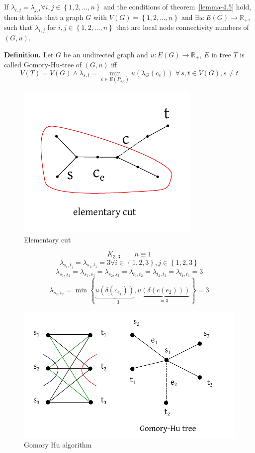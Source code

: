 \documentclass{article}
\newcommand{\set}[1]{\left\{#1\right\}}
\newcommand{\fall}{\;\forall\,}
\begin{document}
  If $\lambda_{i,j} = \lambda_{j,i} \forall i,j \in \set{1, 2, \ldots, n}$ and the conditions of theorem~\ref{lemma-4.5} hold, then it holds that a graph $G$ with $V(G) = \set{1, 2, \ldots, n}$ and $\exists u: E(G) \rightarrow \mathbb{R}_+$, such that $\lambda_{i,j}$ for $i,j \in \set{1, 2, \ldots, n}$ that are local node connectivity numbers of $(G, u)$.

\textbf{Definition.}
  Let $G$ be an undirected graph and $u: E(G) \rightarrow \mathbb{R}_+$, $E$ in tree $T$ is called Gomory-Hu-tree of $(G, u)$ iff
  \[
    V(T) = V(G) \land \lambda_{s,t} = \min_{e \in E(P_{s,t})} u(\lambda_G (c_e)) \fall s,t \in V(G), s \neq t
  \]

\begin{figure}[ht]
 \begin{center}
  \includegraphics{img/fundamental_cut.pdf}
  \caption{Elementary cut}
 \end{center}
\end{figure}

\[
  K_{3,3} \qquad n \equiv 1
\] \[
  \lambda_{s_i,t_j} = \lambda_{s_1, t_1} = 3 \forall i \in \set{1, 2, 3}, j \in \set{1, 2, 3}
\] \[
  \lambda_{s_1,s_2} = \lambda_{s_1,s_3} = \lambda_{s_2,s_3} = \lambda_{t_1,t_2}
    = \lambda_{t_2,t_3} = \lambda_{t_1,t_3} = 3
\] \[
  \lambda_{s_2, t_2} = \min\set{
    \underbrace{u(\delta(c_{e_1}))}_{=3},
    \underbrace{u(\delta(c(e_2)))}_{=3}
  } = 3
\]

\begin{figure}[ht]
 \begin{center}
  \includegraphics{img/gomory_hu.pdf}
  \caption{Gomory Hu algorithm}
 \end{center}
\end{figure}
\end{document}

